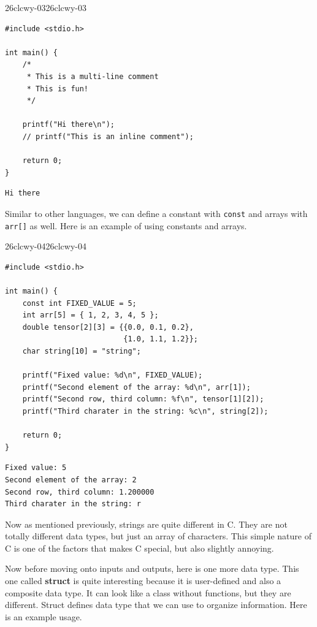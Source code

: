 \documentclass[../../../main.tex]{subfiles}
\begin{document}
\begin{cbox}{26clcwy-03}{26clcwy-03}
\begin{lstlisting}[style=cstyle]
#include <stdio.h>

int main() {
    /*
     * This is a multi-line comment
     * This is fun!
     */

    printf("Hi there\n");
    // printf("This is an inline comment");
    
    return 0;
}
\end{lstlisting}
\end{cbox}
\begin{outputbox}
\begin{lstlisting}[style=basic]
Hi there
\end{lstlisting}
\end{outputbox}

Similar to other languages, we can define a constant with \verb|const|
and arrays with \verb|arr[]| as well. Here is an example of using
constants and arrays.

\begin{cbox}{26clcwy-04}{26clcwy-04}
\begin{lstlisting}[style=cstyle]
#include <stdio.h>

int main() {
    const int FIXED_VALUE = 5;
    int arr[5] = { 1, 2, 3, 4, 5 };
    double tensor[2][3] = {{0.0, 0.1, 0.2},
                           {1.0, 1.1, 1.2}};
    char string[10] = "string";

    printf("Fixed value: %d\n", FIXED_VALUE);
    printf("Second element of the array: %d\n", arr[1]);
    printf("Second row, third column: %f\n", tensor[1][2]);
    printf("Third charater in the string: %c\n", string[2]);

    return 0;
}
\end{lstlisting}
\end{cbox}
\begin{outputbox}
\begin{lstlisting}[style=basic]
Fixed value: 5
Second element of the array: 2
Second row, third column: 1.200000
Third charater in the string: r
\end{lstlisting}
\end{outputbox}

Now as mentioned previously, strings are quite different in C.
They are not totally different data types, but just an array of
characters. This simple nature of C is one of the factors that makes
C special, but also slightly annoying.

Now before moving onto inputs and outputs, here is one more data type.
This one called \textbf{struct} is quite interesting because it is
user-defined and also a composite data type. It can look like a class
without functions, but they are different. Struct defines data type
that we can use to organize information. Here is an example usage.
\end{document}
